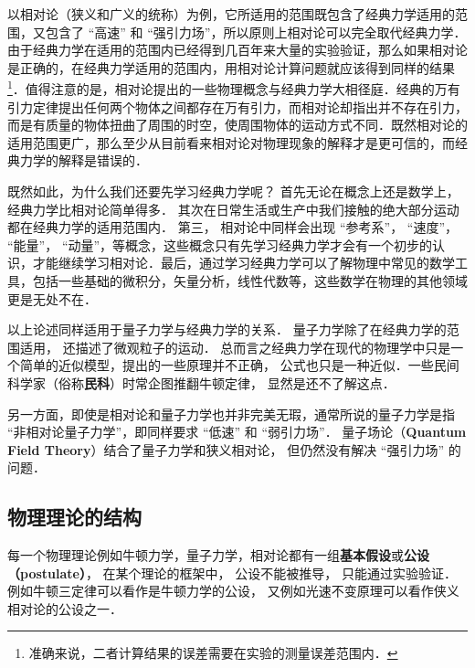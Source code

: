 以相对论（狭义和广义的统称）为例，它所适用的范围既包含了经典力学适用的范围，又包含了 “高速” 和 “强引力场”，所以原则上相对论可以完全取代经典力学．由于经典力学在适用的范围内已经得到几百年来大量的实验验证，那么如果相对论是正确的，在经典力学适用的范围内，用相对论计算问题就应该得到同样的结果\footnote{准确来说，二者计算结果的误差需要在实验的测量误差范围内．}．值得注意的是，相对论提出的一些物理概念与经典力学大相径庭．经典的万有引力定律提出任何两个物体之间都存在万有引力，而相对论却指出并不存在引力，而是有质量的物体扭曲了周围的时空，使周围物体的运动方式不同．既然相对论的适用范围更广，那么至少从目前看来相对论对物理现象的解释才是更可信的，而经典力学的解释是错误的． 

既然如此，为什么我们还要先学习经典力学呢？ 首先无论在概念上还是数学上，经典力学比相对论简单得多． 其次在日常生活或生产中我们接触的绝大部分运动都在经典力学的适用范围内． 第三， 相对论中同样会出现 “参考系”， “速度”， “能量”， “动量”，等概念，这些概念只有先学习经典力学才会有一个初步的认识，才能继续学习相对论．最后，通过学习经典力学可以了解物理中常见的数学工具，包括一些基础的微积分，矢量分析，线性代数等，这些数学在物理的其他领域更是无处不在．

以上论述同样适用于量子力学与经典力学的关系． 量子力学除了在经典力学的范围适用， 还描述了微观粒子的运动． 总而言之经典力学在现代的物理学中只是一个简单的近似模型，提出的一些原理并不正确， 公式也只是一种近似．一些民间科学家（俗称\textbf{民科}）时常企图推翻牛顿定律， 显然是还不了解这点．

另一方面，即使是相对论和量子力学也并非完美无瑕，通常所说的量子力学是指 “非相对论量子力学”，即同样要求 “低速” 和 “弱引力场”． 量子场论（\textbf{Quantum Field Theory}）结合了量子力学和狭义相对论， 但仍然没有解决 “强引力场” 的问题．

\subsection{物理理论的结构}
每一个物理理论例如牛顿力学，量子力学，相对论都有一组\textbf{基本假设}或\textbf{公设（postulate）}， 在某个理论的框架中， 公设不能被推导， 只能通过实验验证． 例如牛顿三定律可以看作是牛顿力学的公设， 又例如光速不变原理可以看作侠义相对论的公设之一．
